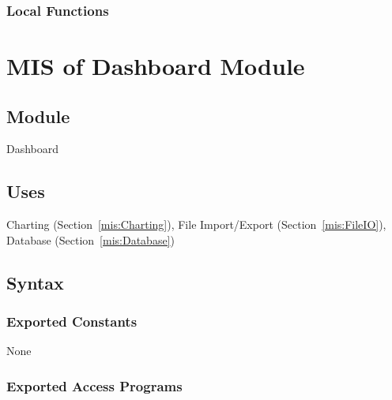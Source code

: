\documentclass[12pt, titlepage]{article}
\newcommand{\Mref}[1]{Section~\ref{#1}}
\begin{document}
\subsubsection{Local Functions}

\newpage

\section{MIS of Dashboard Module} \label{mis:Dashboard}

\subsection{Module}

Dashboard

\subsection{Uses}

Charting (\Mref{mis:Charting}), File Import/Export
(\Mref{mis:FileIO}), Database (\Mref{mis:Database})

\subsection{Syntax}

\subsubsection{Exported Constants}

None

\subsubsection{Exported Access Programs}
\end{document}
